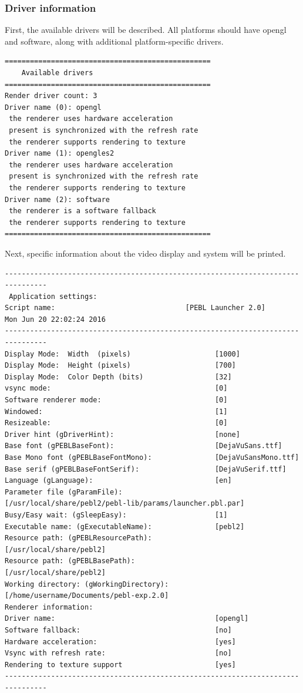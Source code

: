\subsubsection{Driver information}
First, the available drivers will be described.  All platforms should have opengl and software, along with additional platform-specific drivers.
{
\footnotesize
\begin{verbatim}
=================================================
    Available drivers
=================================================
Render driver count: 3
Driver name (0): opengl
 the renderer uses hardware acceleration
 present is synchronized with the refresh rate
 the renderer supports rendering to texture
Driver name (1): opengles2
 the renderer uses hardware acceleration
 present is synchronized with the refresh rate
 the renderer supports rendering to texture
Driver name (2): software
 the renderer is a software fallback
 the renderer supports rendering to texture
=================================================
\end{verbatim}
}

Next, specific information about the video display and system will be printed.
{
\footnotesize

\begin{verbatim}
--------------------------------------------------------------------------------
 Application settings:
Script name:                               [PEBL Launcher 2.0]
Mon Jun 20 22:02:24 2016
--------------------------------------------------------------------------------
Display Mode:  Width  (pixels)                    [1000]
Display Mode:  Height (pixels)                    [700]
Display Mode:  Color Depth (bits)                 [32]
vsync mode:                                       [0]
Software renderer mode:                           [0]
Windowed:                                         [1]
Resizeable:                                       [0]
Driver hint (gDriverHint):                        [none]
Base font (gPEBLBaseFont):                        [DejaVuSans.ttf]
Base Mono font (gPEBLBaseFontMono):               [DejaVuSansMono.ttf]
Base serif (gPEBLBaseFontSerif):                  [DejaVuSerif.ttf]
Language (gLanguage):                             [en]
Parameter file (gParamFile):                      [/usr/local/share/pebl2/pebl-lib/params/launcher.pbl.par]
Busy/Easy wait: (gSleepEasy):                     [1]
Executable name: (gExecutableName):               [pebl2]
Resource path: (gPEBLResourcePath):               [/usr/local/share/pebl2]
Resource path: (gPEBLBasePath):                   [/usr/local/share/pebl2]
Working directory: (gWorkingDirectory):           [/home/username/Documents/pebl-exp.2.0]
Renderer information:
Driver name:                                      [opengl]
Software fallback:                                [no]
Hardware acceleration:                            [yes]
Vsync with refresh rate:                          [no]
Rendering to texture support                      [yes]
--------------------------------------------------------------------------------
\end{verbatim}
}


